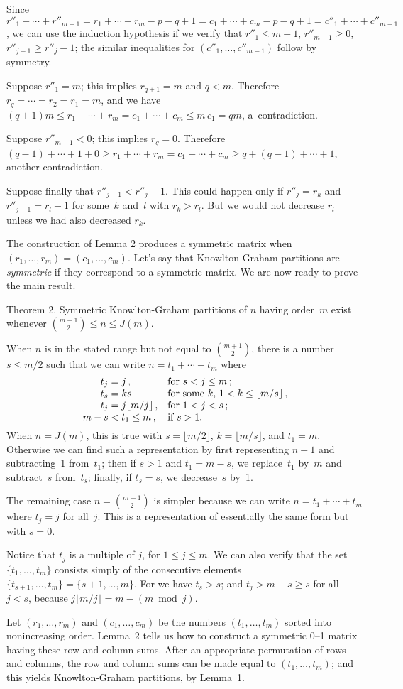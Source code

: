 {Since $r''_1+\cdots +r''_{m-1}=r_1+\cdots +r_m-p-q+1=c_1+\cdots +c_m-p-q+1
=c''_1+\cdots+c''_{m-1}$, we can use the induction hypothesis if we verify
that $r''_1\leq m-1$, $r''_{m-1}\geq 0$, $r''_{j+1}\geq r''_j-1$; the similar
inequalities for $(c''_1,\ldots,c''_{m-1})$ follow by symmetry.

Suppose $r''_1=m$; this implies $r_{q+1}=m$ and $q<m$. Therefore
$r_q=\cdots=r_2=r_1=m$, and we have $(q+1)m\leq r_1+\cdots +r_m=c_1+\cdots
+c_m\leq m\,c_1=qm$, a~contradiction.

Suppose $r''_{m-1}<0$; this implies $r_q=0$. Therefore $(q-1)+\cdots +1+0\geq
r_1+\cdots +r_m=c_1+\cdots +c_m\geq q+(q-1)+\cdots +1$, another contradiction.

Suppose finally that $r''_{j+1}<r''_j-1$. This could happen only if
$r''_j=r_k$ and $r''_{j+1}=r_l-1$ for some~$k$ and~$l$ with $r_k>r_l$.
But we would not decrease $r_l$ unless we had also decreased $r_k$. \ \pfbox

\medskip
The  construction of Lemma 2 produces a symmetric matrix when
$(r_1,\ldots,r_m)=(c_1,\ldots,c_m)$. Let's say that Knowlton-Graham partitions
are {\it symmetric\/} if they correspond to a symmetric matrix. We are now
ready to prove the main result.

\proclaim
Theorem 2. Symmetric Knowlton-Graham partitions of $n$ having order~$m$ exist
whenever ${m+1\choose 2}\leq n\leq J(m)$.

\proof
When $n$ is in the stated range but not equal to ${m+1\choose 2}$, there is a
number $s\leq m/2$ such that we can write $n=t_1+\cdots +t_m$ where
$$\vcenter{\halign{\hfil $#\;$&$#$\hfil\quad&#\hfil\cr
t_j&=j\,,&for $s<j\leq m\,;$\cr
t_s&=ks&for some $k$, $1< k\leq \lfloor m/s\rfloor\,,$\cr
t_j&=j\lfloor m/j\rfloor\,,&for $1<j<s\,;$\cr
m-s&<t_1\leq m\,,&if $s>1$.\cr}}$$
When $n=J(m)$, this is true with $s=\lfloor m/2\rfloor$, $k=\lfloor
m/s\rfloor$, and $t_1=m$. Otherwise we can find such a representation by
first
representing $n+1$ and subtracting~1 from~$t_1$; then if $s>1$ and $t_1=m-s$,
we replace~$t_1$ by~$m$ and subtract~$s$ from~$t_s$; finally, if $t_s=s$, we
decrease~$s$ by~1.

The remaining case $n={m+1\choose 2}$ is simpler because we can write
$n=t_1+\cdots+t_m$ where $t_j=j$ for all~$j$. This is a representation of
essentially the same form but with $s=0$.

Notice that $t_j$ is a multiple of $j$, for $1\leq j\leq m$. We can also verify
that the set $\{t_1,\ldots,t_m\}$ consists simply of the consecutive elements
$\{t_{s+1},\ldots,t_m\}=\{s+1,\ldots,m\}$. For we have $t_s>s$; and
$t_j>m-s\geq s$ for all $j<s$, because $j\lfloor m/j\rfloor =m-(m\bmod j)$.

Let $(r_1,\ldots,r_m)$ and $(c_1,\ldots,c_m)$ be the numbers $(t_1,\ldots,t_m)$
sorted into nonincreasing order. Lemma~2 tells us how to construct a symmetric
0--1 matrix having these row and column sums. After an appropriate permutation
of rows and columns, the row and column sums can be made equal to
$(t_1,\ldots,t_m)$; and this yields Knowlton-Graham partitions, by Lemma~1.
\ \pfbox

}

